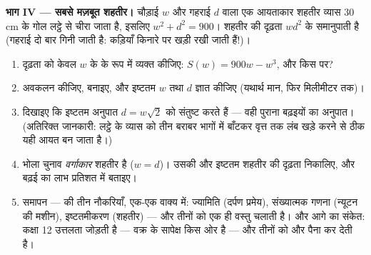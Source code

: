 \begin{problem}
\medskip
\noindent\textbf{भाग IV --- सबसे मज़बूत शहतीर।}
चौड़ाई $w$ और गहराई $d$ वाला एक आयताकार शहतीर व्यास $30$ cm के गोल
लट्ठे से चीरा जाता है, इसलिए $w^2 + d^2 = 900$। शहतीर की दृढ़ता $w d^2$ के समानुपाती है
(गहराई दो बार गिनी जाती है: कड़ियाँ किनारे पर खड़ी रखी जाती हैं!)।
\begin{enumerate}[resume]
  \item दृढ़ता को केवल $w$ के  के रूप में व्यक्त कीजिए: $S(w) = 900w - w^3$, और किस
         पर?
  \item अवकलन कीजिए,  बनाइए, और इष्टतम $w$ तथा $d$ ज्ञात
        कीजिए (यथार्थ मान, फिर मिलीमीटर तक)।
  \item दिखाइए कि इष्टतम अनुपात $d = w\sqrt2$ को संतुष्ट करते हैं --- वही पुराना
        बढ़इयों का अनुपात। (अतिरिक्त जानकारी: लट्ठे के व्यास को तीन बराबर
        भागों में बाँटकर वृत्त तक लंब खड़े करने से ठीक यही आयत बन जाता है।)
  \item भोला चुनाव \emph{वर्गाकार} शहतीर है ($w = d$)। उसकी और इष्टतम शहतीर
        की दृढ़ता निकालिए, और बढ़ई का लाभ प्रतिशत में बताइए।
  \item समापन ---  की तीन नौकरियाँ, एक-एक वाक्य में: ज्यामिति
        (दर्पण प्रमेय), संख्यात्मक गणना (न्यूटन की मशीन), इष्टतमीकरण
        (शहतीर) --- और तीनों को एक ही वस्तु चलाती है। और आगे का संकेत:
        कक्षा 12 उत्तलता जोड़ती है --- वक्र के सापेक्ष  किस ओर
        है --- और तीनों को और पैना कर देती है।
\end{enumerate}
\end{problem}
